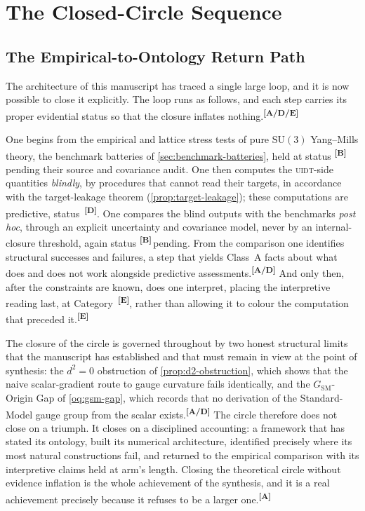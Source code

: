\documentclass[12pt,a4paper,twoside]{article}
\theoremstyle{plain}
\theoremstyle{definition}
\theoremstyle{remark}
\newcommand{\UIDT}{\textsc{uidt}}
\newcommand{\catmark}[1]{\textsuperscript{\textsf{\textbf{[#1]}}}}
\begin{document}
\section{The Closed-Circle Sequence}
\label{sec:closed-circle}

\subsection{The Empirical-to-Ontology Return Path}
\label{subsec:return-path}

The architecture of this manuscript has traced a single large loop, and it is now possible to close it explicitly. The loop runs as follows, and each step carries its proper evidential status so that the closure inflates nothing.\catmark{A/D/E}

One begins from the empirical and lattice stress tests of pure $\mathrm{SU}(3)$ Yang--Mills theory, the benchmark batteries of \cref{sec:benchmark-batteries}, held at status \catmark{B}\,pending their source and covariance audit. One then computes the \UIDT-side quantities \emph{blindly}, by procedures that cannot read their targets, in accordance with the target-leakage theorem (\cref{prop:target-leakage}); these computations are predictive, status~\catmark{D}. One compares the blind outputs with the benchmarks \emph{post hoc}, through an explicit uncertainty and covariance model, never by an internal-closure threshold, again status \catmark{B}\,pending. From the comparison one identifies structural successes and failures, a step that yields Class~A facts about what does and does not work alongside predictive assessments.\catmark{A/D} And only then, after the constraints are known, does one interpret, placing the interpretive reading last, at Category~\catmark{E}, rather than allowing it to colour the computation that preceded it.\catmark{E}

The closure of the circle is governed throughout by two honest structural limits that the manuscript has established and that must remain in view at the point of synthesis: the $d^2 = 0$ obstruction of \cref{prop:d2-obstruction}, which shows that the naive scalar-gradient route to gauge curvature fails identically, and the $G_{\mathrm{SM}}$-Origin Gap of \cref{oq:gsm-gap}, which records that no derivation of the Standard-Model gauge group from the scalar exists.\catmark{A/D} The circle therefore does not close on a triumph. It closes on a disciplined accounting: a framework that has stated its ontology, built its numerical architecture, identified precisely where its most natural constructions fail, and returned to the empirical comparison with its interpretive claims held at arm's length. Closing the theoretical circle without evidence inflation is the whole achievement of the synthesis, and it is a real achievement precisely because it refuses to be a larger one.\catmark{A}
\end{document}
